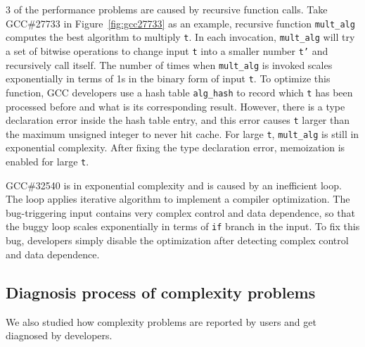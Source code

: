 3 of the performance problems are caused by recursive function calls. 
Take GCC\#27733 in Figure~\ref{fig:gcc27733} as an example, 
recursive function \texttt{mult\_alg} computes the best algorithm to multiply \texttt{t}.
In each invocation, \texttt{mult\_alg} will try a set of bitwise 
operations to change input 
\texttt{t} into a smaller number \texttt{t'} and recursively call itself. 
The number of times when \texttt{mult\_alg} is invoked scales exponentially 
in terms of 1s in the binary form of input \texttt{t}. 
To optimize this function, 
GCC developers use a hash table \texttt{alg\_hash} to record
which \texttt{t} has been processed before and what is its corresponding result.
However, there is a type declaration error inside the hash table entry,
and this error causes \texttt{t} larger than the maximum unsigned integer to never hit cache.
For large \texttt{t}, \texttt{mult\_alg} is still in exponential complexity. 
After fixing the type declaration error, 
memoization is enabled for large \texttt{t}. 

GCC\#32540 is in exponential complexity and is caused by an inefficient loop. 
The loop applies iterative algorithm to implement a compiler optimization. 
The bug-triggering input contains very complex control and data dependence,  
so that the buggy loop scales exponentially in terms of \texttt{if} branch in the input. 
To fix this bug, developers simply disable the optimization 
after detecting complex control and data dependence.  



\subsection{Diagnosis process of complexity problems}
\label{sec:process}

We also studied how complexity problems are reported by users and get diagnosed by developers. 

